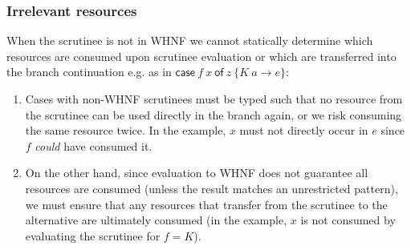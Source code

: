 \documentclass[acmsmall,review,screen]{acmart}
\newcommand{\ccase}[2]{\mathsf{case}~#1~\mathsf{of}~#2}
\newcommand{\ROUNDTWO}[1]{{\color{red}#1}}
\begin{document}


\subsubsection{Irrelevant resources}\label{sec:irrev}

When the scrutinee is not in WHNF
\ROUNDTWO{we cannot statically determine which resources are consumed
  upon scrutinee evaluation or which are transferred into the branch continuation}
e.g. as in $\ccase{f\ x}{z\ \{K\
a \rightarrow e\}}$:
\begin{enumerate}

    \item Cases with non-WHNF scrutinees must be typed such that no resource
    from the scrutinee can be used directly in the branch again, or we
    risk
    consuming the same resource twice. In the example, $x$ must not directly occur
    in $e$ since $f$ \emph{could} have consumed it.

    \item On the other hand, since evaluation to WHNF does not guarantee all
    resources are consumed (unless the result matches an
    unrestricted pattern), we must ensure that any resources that transfer from the
    scrutinee to the alternative are ultimately consumed (in the example, $x$
    is not consumed by evaluating the scrutinee for $f = K$).


%
\end{enumerate}
\end{document}
